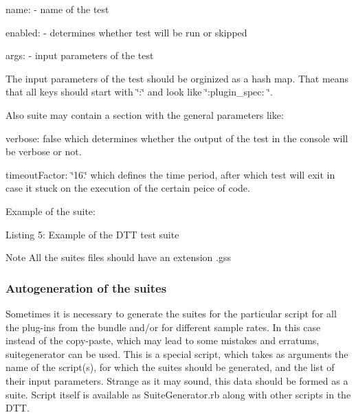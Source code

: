\begin{DoxyItemize}
\item {\ttfamily name\+: } -\/ name of the test 
\item {\ttfamily enabled\+: } -\/ determines whether test will be run or skipped 
\item {\ttfamily args\+: } -\/ input parameters of the test 
\end{DoxyItemize}

The input parameters of the test should be orginized as a hash map. That means that all keys should start with \char`\"{}\+:\char`\"{} and look like \char`\"{}\+:plugin\+\_\+spec\+: \char`\"{}.

Also suite may contain a section with the general parameters like\+:


\begin{DoxyItemize}
\item {\ttfamily verbose\+: false} which determines whether the output of the test in the console will be verbose or not. 
\item {\ttfamily timeout\+Factor\+: \char`\"{}16.\char`\"{}} which defines the time period, after which test will exit in case it stuck on the execution of the certain peice of code. 
\end{DoxyItemize}

Example of the suite\+: 
\begin{DoxyCode}{0}
\DoxyCodeLine{\textcolor{preprocessor}{\#}}
\DoxyCodeLine{\textcolor{preprocessor}{\# Cycle counting test}}
\DoxyCodeLine{\textcolor{preprocessor}{\#}}
\end{DoxyCode}
 Listing 5\+: Example of the D\+TT test suite

\begin{DoxyNote}{Note}
All the suites files should have an extension .gss
\end{DoxyNote}
\hypertarget{a00836_autogeneration_of_the_suites}{}\subsubsection{Autogeneration of the suites}\label{a00836_autogeneration_of_the_suites}
 Sometimes it is necessary to generate the suites for the particular script for all the plug-\/ins from the bundle and/or for different sample rates. In this case instead of the copy-\/paste, which may lead to some mistakes and erratums, suitegenerator can be used. This is a special script, which takes as arguments the name of the script(s), for which the suites should be generated, and the list of their input parameters. Strange as it may sound, this data should be formed as a suite. Script itself is available as Suite\+Generator.\+rb along with other scripts in the D\+TT.

